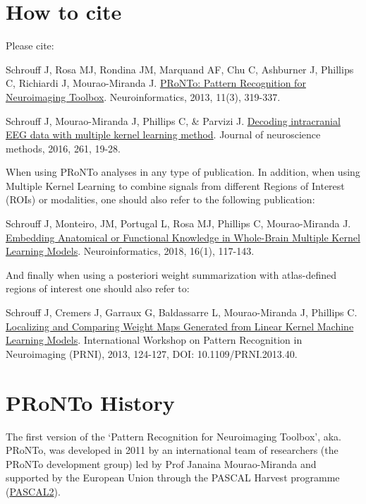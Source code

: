 \section{How to cite}
Please cite: 

\bi
\item Schrouff J, Rosa MJ, Rondina JM, Marquand AF, Chu C, Ashburner J, Phillips C, Richiardi J, Mourao-Miranda J. \href{https://doi.org/10.1007/s12021-013-9178-1}{PRoNTo: Pattern Recognition for Neuroimaging Toolbox}. Neuroinformatics, 2013, 11(3), 319-337.
\ei

\bi
\item Schrouff J, Mourao-Miranda J, Phillips C, \& Parvizi J. \href{https://doi.org/10.1016/j.jneumeth.2015.11.028}{Decoding intracranial EEG data with multiple kernel learning method}. Journal of neuroscience methods, 2016, 261, 19-28. 
\ei

\noindent When using PRoNTo analyses in any type of publication. In addition, when using Multiple Kernel Learning to combine signals from different Regions of Interest (ROIs) or modalities, one should also refer to the following publication: 

\bi
\item Schrouff J, Monteiro, JM, Portugal L, Rosa MJ, Phillips C, Mourao-Miranda J. \href{https://doi.org/10.1007/s12021-017-9347-8}{Embedding Anatomical or Functional Knowledge in Whole-Brain Multiple Kernel Learning Models}. Neuroinformatics, 2018, 16(1), 117-143. 
\ei

\noindent And finally when using a posteriori weight summarization with atlas-defined regions of interest one should also refer to:

\bi
\item Schrouff J, Cremers J, Garraux G, Baldassarre L, Mourao-Miranda J, Phillips C. \href{https://doi.org/10.1109/PRNI.2013.40}{Localizing and Comparing Weight Maps Generated from Linear Kernel Machine Learning Models}. International Workshop on Pattern Recognition in Neuroimaging (PRNI), 2013, 124-127, DOI: 10.1109/PRNI.2013.40.
\ei



\section{PRoNTo History}

The first version of the `Pattern Recognition for Neuroimaging Toolbox', aka. PRoNTo, was developed in 2011 by an international team of researchers (the PRoNTo development group) led by Prof Janaina Mourao-Miranda and supported by the European Union through the PASCAL Harvest programme (\href{https://cordis.europa.eu/project/id/216886}{PASCAL2}).
\\

